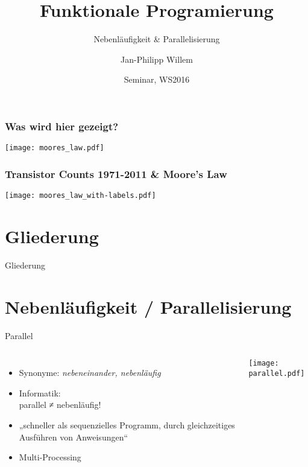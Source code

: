 \documentclass[compress]{beamer}
\title{Funktionale \break Programierung}
\subtitle{Nebenläufigkeit \& Parallelisierung}
\author{Jan-Philipp Willem}
\institute{
  Prof. Dr. Sandro Leuchter\\
  Fakultät für Informatik\\
  Hochschule Mannheim
}
\date{Seminar, WS2016}
\begin{document}
\begin{frame}
  \frametitle{Was wird hier gezeigt?}
  \texttt{[image: moores\_law.pdf]}
\end{frame}
 
\begin{frame}
  \frametitle{Transistor Counts 1971-2011 \& Moore's Law}
  \texttt{[image: moores\_law\_with-labels.pdf]}
\end{frame}

\maketitle

\section*{Gliederung}
\begin{frame}{Gliederung}
  \tableofcontents[hideallsubsections]
\end{frame}

\section{Nebenläufigkeit / Parallelisierung}
  \begin{frame}{Parallel}
  \setcounter{framenumber}{1}
    \begin{columns}[c]
      \begin{itemize}
        \item Synonyme: \textit{nebeneinander, nebenläufig}
        \item Informatik:\\parallel ≠ nebenläufig!
        \item „schneller als sequenzielles Programm, durch gleichzeitiges Ausführen von \alert{Anweisungen}“
        \item Multi-Processing
      \end{itemize}
    \texttt{[image: parallel.pdf]}
    \end{columns}
  \end{frame}

\end{document}
